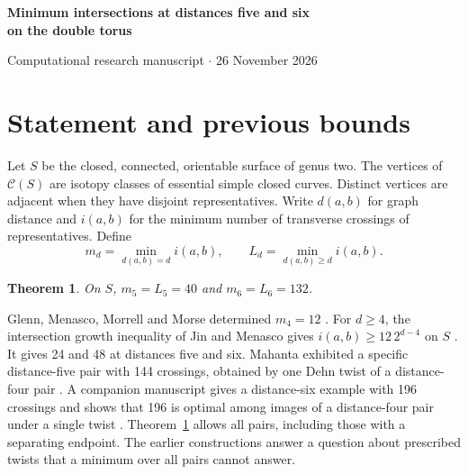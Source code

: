 \documentclass[11pt,a4paper]{article}
\newtheorem{theorem}{Theorem}
\newcommand{\C}{\mathcal C}
\begin{document}
\begin{center}
{\LARGE\bfseries Minimum intersections at distances five and six\\[3pt]
on the double torus\par}
\vspace{8pt}
{\small Computational research manuscript \(\cdot\) 26 November 2026}
\end{center}
\begin{abstract}
In the curve graph of the closed orientable genus-two surface, the least geometric
intersection numbers at distances five and six are 40 and 132. The same minima
hold when each distance is a lower bound. We encode a filling pair by a weighted
triangulation of the surface cut along one endpoint and a cyclic boundary gluing.
To exclude smaller examples, a census constructs short paths, using only elementary
curves that cross each band at most once and lower bounds at previously completed
distances. Two distance-six minimizers have absolute algebraic intersections
96 and 48, so they belong to different homeomorphism orbits. We verify the exact
distances of the examples separately using efficient geodesics.
\end{abstract}

\section{Statement and previous bounds}
Let \(S\) be the closed, connected, orientable surface of genus two. The vertices
of \(\C(S)\) are isotopy classes of essential simple closed curves. Distinct
vertices are adjacent when they have disjoint representatives. Write \(d(a,b)\)
for graph distance and \(i(a,b)\) for the minimum number of transverse crossings
of representatives. Define
\[
 m_d=\min_{d(a,b)=d}i(a,b),\qquad L_d=\min_{d(a,b)\ge d}i(a,b).
\]
\begin{theorem}\label{th:main}
On \(S\), \(m_5=L_5=40\) and \(m_6=L_6=132\).
\end{theorem}

Glenn, Menasco, Morrell and Morse determined \(m_4=12\) \cite[Thm.~1.6]{GMMM}.
For \(d\ge4\), the intersection growth inequality of Jin and Menasco gives
\(i(a,b)\ge12\,2^{d-4}\) on \(S\) \cite[Thm.~1.3]{JM}. It gives 24 and 48 at
distances five and six. Mahanta exhibited a specific distance-five pair with
144 crossings, obtained by one Dehn twist of a distance-four pair \cite[\S6]{M}.
A companion manuscript gives a distance-six example with 196 crossings and shows
that 196 is optimal among images of a distance-four pair under a single twist
\cite[\S7]{ST}. Theorem~\ref{th:main} allows all pairs, including those with a
separating endpoint. The earlier constructions answer a question about prescribed
twists that a minimum over all pairs cannot answer.
\end{document}
